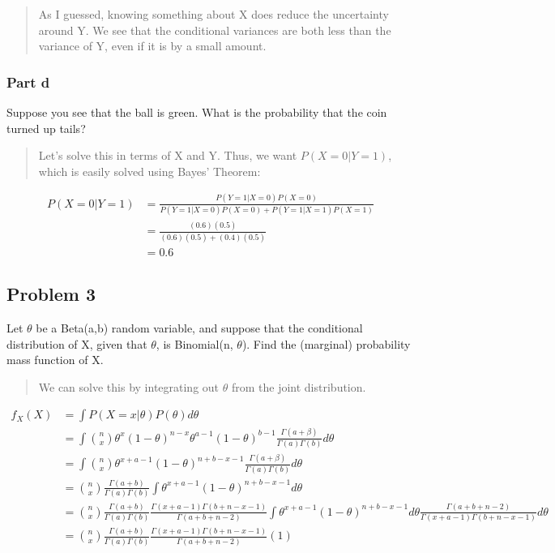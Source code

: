 \documentclass[
  letterpaper,
  DIV=11,
  numbers=noendperiod]{scrartcl}
\begin{document}
\begin{quote}
As I guessed, knowing something about X does reduce the uncertainty
around Y. We see that the conditional variances are both less than the
variance of Y, even if it is by a small amount.
\end{quote}

\subsubsection{Part d}\label{part-d}

Suppose you see that the ball is green. What is the probability that the
coin turned up tails?

\begin{quote}
Let's solve this in terms of X and Y. Thus, we want \(P(X=0|Y=1)\),
which is easily solved using Bayes' Theorem:
\end{quote}

\begin{align*}
P(X=0|Y=1) &= \frac{P(Y=1|X=0)P(X=0)}{P(Y=1|X=0)P(X=0) + P(Y=1|X=1)P(X=1)}\\
&= \frac{(0.6)(0.5)}{(0.6)(0.5) + (0.4)(0.5)}\\
&= 0.6
\end{align*}

\subsection{Problem 3}\label{problem-3}

Let \(\theta\) be a Beta(a,b) random variable, and suppose that the
conditional distribution of X, given that \(\theta\), is Binomial(n,
\(\theta\)). Find the (marginal) probability mass function of X.

\begin{quote}
We can solve this by integrating out \(\theta\) from the joint
distribution.
\end{quote}

\begin{align*}
f_X(X) &= \int P(X=x|\theta)P(\theta)d\theta\\
&= \int {n \choose x} \theta^x(1 - \theta)^{n - x}\theta^{a-1}(1-\theta)^{b-1}\frac{\Gamma(a + \beta)}{\Gamma(a)\Gamma(b)}d\theta\\
&= \int {n \choose x} \theta^{x+a-1}(1 - \theta)^{n + b- x-1}\frac{\Gamma(a + \beta)}{\Gamma(a)\Gamma(b)}d\theta\\
&= {n \choose x}\frac{\Gamma(a+b)}{\Gamma(a)\Gamma(b)} \int\theta^{x+a-1}(1 - \theta)^{n + b- x-1}d\theta\\
&= {n \choose x}\frac{\Gamma(a+b)}{\Gamma(a)\Gamma(b)}\frac{\Gamma(x + a - 1)\Gamma(b + n - x - 1)}{\Gamma(a + b + n - 2)}\int \theta^{x+a-1}(1 - \theta)^{n + b- x-1}d\theta \frac{\Gamma(a + b + n - 2)}{\Gamma(x + a - 1)\Gamma(b + n - x - 1)}d\theta\\
&= {n \choose x}\frac{\Gamma(a+b)}{\Gamma(a)\Gamma(b)}\frac{\Gamma(x + a - 1)\Gamma(b + n - x - 1)}{\Gamma(a + b + n - 2)} (1)\\
\end{align*}
\end{document}
